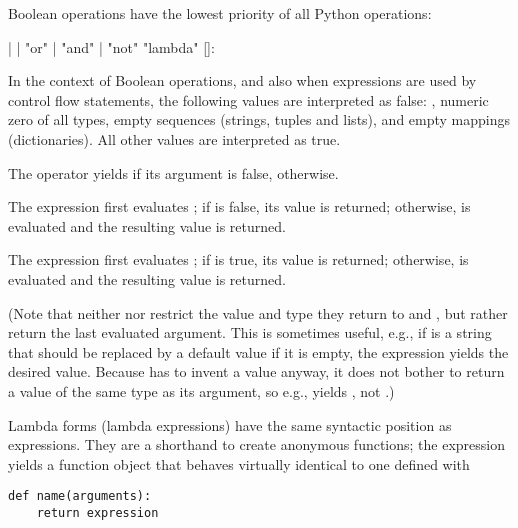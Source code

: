 Boolean operations have the lowest priority of all Python operations:

\begin{productionlist}
             { | }
             { |  "or" }
             { |  "and" }
             { | "not" }
             {"lambda" []: }
\end{productionlist}

In the context of Boolean operations, and also when expressions are
used by control flow statements, the following values are interpreted
as false: , numeric zero of all types, empty sequences
(strings, tuples and lists), and empty mappings (dictionaries).  All
other values are interpreted as true.

The operator  yields  if its argument is false,
 otherwise.

The expression  first evaluates ; if
 is false, its value is returned; otherwise,  is
evaluated and the resulting value is returned.

The expression  first evaluates ; if
 is true, its value is returned; otherwise,  is
evaluated and the resulting value is returned.

(Note that neither  nor  restrict the value
and type they return to  and , but rather return the
last evaluated argument.
This is sometimes useful, e.g., if  is a string that should be
replaced by a default value if it is empty, the expression
 yields the desired value.  Because  has to
invent a value anyway, it does not bother to return a value of the
same type as its argument, so e.g.,  yields ,
not .)

Lambda forms (lambda expressions) have the same syntactic position as
expressions.  They are a shorthand to create anonymous functions; the
expression 
yields a function object that behaves virtually identical to one
defined with

\begin{verbatim}
def name(arguments):
    return expression
\end{verbatim}


